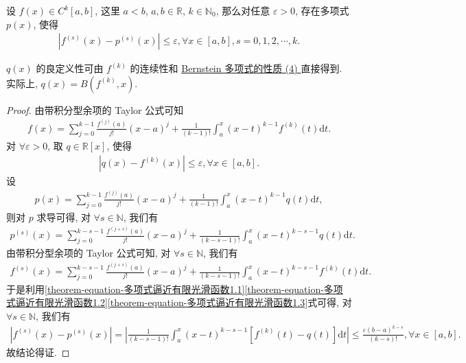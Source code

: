 \documentclass[../../main.tex]{subfiles}
\begin{document}
\begin{theorem}\label{theorem:多项式逼近有限阶光滑函数}
设 $f(x) \in C^{k}[a,b]$, 这里 $a < b$, $a,b \in \mathbb{R}$, $k \in \mathbb{N}_0$, 那么对任意 $\varepsilon > 0$, 存在多项式 $p(x)$, 使得
\begin{align*}
\left| f^{(s)}(x) - p^{(s)}(x) \right| \leqslant \varepsilon, \forall x \in [a,b], s = 0,1,2,\cdots,k.
\end{align*}
\end{theorem}
\begin{remark}
$q(x)$ 的良定义性可由 $f^{(k)}$ 的连续性和 \hyperref[theorem:Bernstein多项式的性质]{Bernstein 多项式的性质 (4) }直接得到. 实际上, $q(x) = B(f^{(k)},x)$.
\end{remark}
\begin{proof}
由带积分型余项的 Taylor 公式可知
\begin{align*}
f(x) = \sum_{j = 0}^{k - 1} \frac{f^{(j)}(a)}{j!}(x - a)^j + \frac{1}{(k - 1)!} \int_a^x (x - t)^{k - 1} f^{(k)}(t) \mathrm{d}t.
\end{align*}
对 $\forall \varepsilon > 0$, 取 $q \in \mathbb{R}[x]$, 使得
\begin{align}
|q(x) - f^{(k)}(x)| \leqslant \varepsilon, \forall x \in [a,b]. \label{theorem-equation-多项式逼近有限光滑函数1.1}
\end{align}
设
\begin{align*}
p(x) = \sum_{j = 0}^{k - 1} \frac{f^{(j)}(a)}{j!}(x - a)^j + \frac{1}{(k - 1)!} \int_a^x (x - t)^{k - 1} q(t) \mathrm{d}t,
\end{align*}
则对 $p$ 求导可得, 对 $\forall s \in \mathbb{N}$, 我们有
\begin{align}
p^{(s)}(x) = \sum_{j = 0}^{k - s - 1} \frac{f^{(j + s)}(a)}{j!}(x - a)^j + \frac{1}{(k - s - 1)!} \int_a^x (x - t)^{k - s - 1} q(t) \mathrm{d}t. \label{theorem-equation-多项式逼近有限光滑函数1.2}
\end{align}
由带积分型余项的 Taylor 公式可知, 对 $\forall s \in \mathbb{N}$, 我们有
\begin{align}
f^{(s)}(x) = \sum_{j = 0}^{k - s - 1} \frac{f^{(j + s)}(a)}{j!}(x - a)^j + \frac{1}{(k - s - 1)!} \int_a^x (x - t)^{k - s - 1} f^{(k)}(t) \mathrm{d}t.\label{theorem-equation-多项式逼近有限光滑函数1.3}
\end{align}
于是利用\eqref{theorem-equation-多项式逼近有限光滑函数1.1}\eqref{theorem-equation-多项式逼近有限光滑函数1.2}\eqref{theorem-equation-多项式逼近有限光滑函数1.3}式可得, 对 $\forall s \in \mathbb{N}$, 我们有
\begin{align*}
|f^{(s)}(x) - p^{(s)}(x)| = \left| \frac{1}{(k - s - 1)!} \int_a^x (x - t)^{k - s - 1} [f^{(k)}(t) - q(t)] \mathrm{d}t \right| \leqslant \frac{\varepsilon (b - a)^{k - s}}{(k - s)!}, \forall x \in [a,b].
\end{align*}
故结论得证.
\end{proof}
\end{document}
